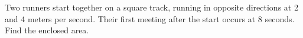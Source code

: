Two runners start together on a square track, running in opposite directions at 2 and 4 meters per second. Their first meeting after the start occurs at 8 seconds. Find the enclosed area.
